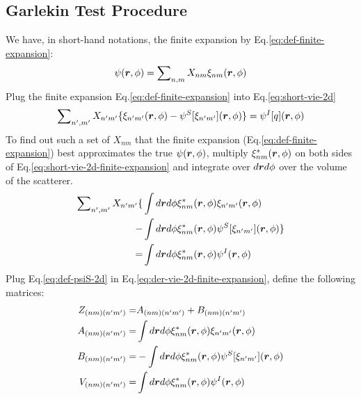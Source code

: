 \documentclass [10pt,letterpaper]{article}
\renewcommand{\vec}{\vectorsym}
\begin{document}
\subsection{Garlekin Test Procedure}
\label{sub:garlekin-test-procedure}
We have, in short-hand notations, the finite expansion by Eq.\eqref{eq:def-finite-expansion}:
\begin{equation} \label{eq:short-fintie-expansion}
	\psi(\vec{r},\phi)=\sum\nolimits_{n,m}X_{n m}\xi_{n m}(\vec{r},\phi)
\end{equation}
Plug the finite expansion Eq.\eqref{eq:def-finite-expansion} into Eq.\eqref{eq:short-vie-2d}
\begin{equation} \label{eq:short-vie-2d-finite-expansion}
	\sum\nolimits_{n^\prime,m^\prime}
	X_{n^\prime m^\prime}
	\{
		\xi_{n^\prime m^\prime}(\vec{r},\phi)
		-\psi^S[\xi_{n^\prime m^\prime}](\vec{r},\phi)
	\}
	=\psi^I[q](\vec{r},\phi)
\end{equation}
To find out such a set of $X_{n m}$ that the finite expansion (Eq.\eqref{eq:def-finite-expansion}) best approximates the true $\psi(\vec{r},\phi)$, multiply $\xi^*_{n m}(\vec{r},\phi)$ on both sides of Eq.\eqref{eq:short-vie-2d-finite-expansion} and integrate over $d\vec{r}d\phi$ over the volume of the scatterer.
\begin{equation} \label{eq:der-vie-2d-finite-expansion}
	\begin{split}
		\sum\nolimits_{n^\prime,m^\prime}
		X_{n^\prime m^\prime}
		\{&
			\int d\vec{r} d\phi
			\xi^*_{n m}(\vec{r},\phi)
			\xi_{n^\prime m^\prime}(\vec{r},\phi)
			\\
		-&
			\int d\vec{r} d\phi
			\xi^*_{n m}(\vec{r},\phi)
			\psi^S[\xi_{n^\prime m^\prime}](\vec{r},\phi)
		\}
		\\
		=&
		\int d\vec{r} d\phi
		\xi^*_{n m}(\vec{r},\phi)
		\psi^I(\vec{r},\phi)
		\end{split}
\end{equation}
Plug Eq.\eqref{eq:def-psiS-2d} in Eq.\eqref{eq:der-vie-2d-finite-expansion}, define the following matrices:
\begin{align} \label{eq:def-Z-A-B-V}
	Z_{(n m)(n^\prime m^\prime)}
	=&
	A_{(n m)(n^\prime m^\prime)}
	+B_{(n m)(n^\prime m^\prime)}
	\\
	A_{(n m)(n^\prime m^\prime)}
	=&
	\int d\vec{r}d\phi
	\xi^*_{n m}(\vec{r},\phi)
	\xi_{n^\prime m^\prime}
	(\vec{r},\phi)
	\\
	B_{(n m)(n^\prime m^\prime)}
	=&
	-\int d\vec{r}d\phi
	\xi^*_{n m}(\vec{r},\phi)
	\psi^S
	[\xi_{n^\prime m^\prime}]
	(\vec{r},\phi)
	\\
	V_{(n m)(n^\prime m^\prime)}
	=&
	\int d\vec{r}d\phi
	\xi^*_{n m}(\vec{r},\phi)
	\psi^I(\vec{r},\phi) 
\end{align}
\end{document}
